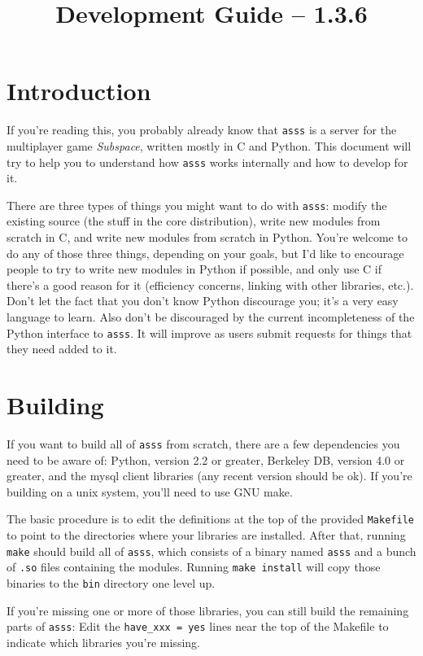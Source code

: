 \documentclass{article}
\title{\asss{} Development Guide -- 1.3.6}
\newcommand{\asss}{\texttt{asss}}
\begin{document}
\maketitle

\section{Introduction}

If you're reading this, you probably already know that \asss{} is a
server for the multiplayer game \emph{Subspace}, written mostly in C and
Python. This document will try to help you to understand how \asss{}
works internally and how to develop for it.

There are three types of things you might want to do with \asss{}:
modify the existing source (the stuff in the core distribution), write
new modules from scratch in C, and write new modules from scratch in
Python. You're welcome to do any of those three things, depending on
your goals, but I'd like to encourage people to try to write new modules
in Python if possible, and only use C if there's a good reason for it
(efficiency concerns, linking with other libraries, etc.). Don't let the
fact that you don't know Python discourage you; it's a very easy
language to learn. Also don't be discouraged by the current
incompleteness of the Python interface to \asss{}. It will improve as
users submit requests for things that they need added to it.


\section{Building}

If you want to build all of \asss{} from scratch, there are a few
dependencies you need to be aware of: Python, version 2.2 or greater,
Berkeley DB, version 4.0 or greater, and the mysql client libraries (any
recent version should be ok). If you're building on a unix system,
you'll need to use GNU make.

The basic procedure is to edit the definitions at the top of the
provided \verb/Makefile/ to point to the directories where your
libraries are installed. After that, running \verb/make/ should build
all of \asss{}, which consists of a binary named \verb/asss/ and a bunch
of \verb/.so/ files containing the modules. Running \verb/make install/
will copy those binaries to the \verb/bin/ directory one level up.

If you're missing one or more of those libraries, you can still build
the remaining parts of \asss{}: Edit the \verb/have_xxx = yes/ lines
near the top of the Makefile to indicate which libraries you're missing.
\end{document}
